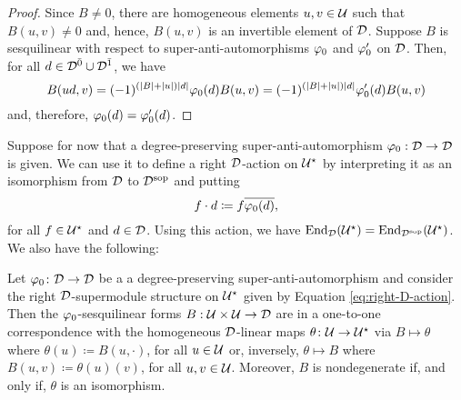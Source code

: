 \begin{proof}
    Since $B\neq 0$, there are homogeneous elements $u, v\in \mathcal U$ such that $B(u,v) \neq 0$ and, hence, $B(u,v)$ is an invertible element of $\mathcal{D}$. 
    Suppose $B$ is sesquilinear with respect to super-anti-automorphisms $\varphi_0$ and $\varphi_0'$ on $\mathcal{D}$.
    Then, for all $d\in \mathcal{D}^{\bar0} \cup \mathcal{D}^{\bar1}$, we have
    \[ B(ud,v) = (-1)^ {(|B| + |u|)|d|} \varphi_0(d) B(u,v) = (-1)^ {(|B| + |u|)|d|} \varphi_0'(d) B(u,v) \]
    and, therefore, $\varphi_0(d) = \varphi_0'(d)$.
\end{proof}

Suppose for now that a degree-preserving su\-per\--an\-ti\--auto\-mor\-phism $\varphi_0: \mathcal{D} \to \mathcal{D}$ is given. 
We can use it to define a right $\mathcal{D}$-action on $\mathcal U^\star$ by interpreting it as an isomorphism from $\mathcal{D}$ to $\mathcal{D}^{\mathrm{sop}}$ and putting 
%
\begin{equation}\label{eq:right-D-action}
    f\cdot d \coloneqq f \overline{\varphi_0(d)},
\end{equation}
%
for all $f \in \mathcal U^\star$ and $d\in \mathcal{D}$. 
Using this action, we have $\operatorname{End}_{\mathcal{D}} (\mathcal U^\star) = \operatorname{End}_{\mathcal{D}^{\mathrm{sop}}} (\mathcal U^\star)$. We also have the following:

\begin{prop}\label{prop:sesquilinear-form-iff-D-linear-map}
    Let $\varphi_0\colon \mathcal{D} \to \mathcal{D}$ be a a degree-preserving su\-per\--an\-ti\--auto\-mor\-phism and consider the right $\mathcal{D}$-supermodule structure on $\mathcal U^\star$ given by Equation \eqref{eq:right-D-action}. 
    Then the $\varphi_0$-sesquilinear forms $B:\mathcal U\times\mathcal U \to \mathcal{D}$ are in a one-to-one correspondence with the homogeneous $\mathcal{D}$-linear maps $\theta\colon \mathcal U \to \mathcal U^\star$ via $B \mapsto \theta$ where $\theta(u) \coloneqq B(u, \cdot)$, for all $u \in \mathcal U$ or, inversely, $\theta \mapsto B$ where $B(u,v) \coloneqq \theta(u)(v)$, for all $u, v\in \mathcal U$. 
    Moreover, $B$ is nondegenerate if, and only if, $\theta$ is an isomorphism.
\end{prop}

